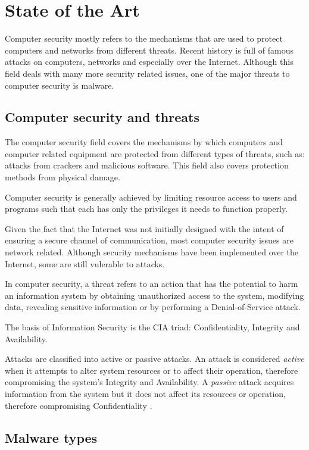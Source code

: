 \chapter{State of the Art}
\label{chapter:second}

Computer security mostly refers to the mechanisms that are used to protect computers and networks from different threats. Recent history is full of famous attacks on computers, networks and especially over the Internet. Although this field deals with many more security related issues, one of the major threats to computer security is malware.

\section{Computer security and threats}

The computer security field covers the mechanisms by which computers and computer related equipment are protected from different types of threats, such as: attacks from crackers and malicious software. This field also covers protection methods from physical damage.

Computer security is generally achieved by limiting resource access to users and programs such that each has only the privileges it needs to function properly.

Given the fact that the Internet was not initially designed with the intent of ensuring a secure channel of communication, most computer security issues are network related. Although security mechanisms have been implemented over the Internet, some are still vulerable to attacks.

In computer security, a threat refers to an action that has the potential to harm an information system by obtaining unauthorized access to the system, modifying data, revealing sensitive information or by performing a Denial-of-Service attack.

The basis of Information Security is the CIA triad: Confidentiality, Integrity and Availability.

Attacks are classified into active or passive attacks. An attack is considered \textit{active} when it attempts to alter system resources or to affect their operation, therefore compromising the system's Integrity and Availability.
A \textit{passive} attack acquires information from the system but it does not affect its resources or operation, therefore compromising Confidentiality \cite{rfc2828}.

\section{Malware types}
\label{sec:mal-types}

